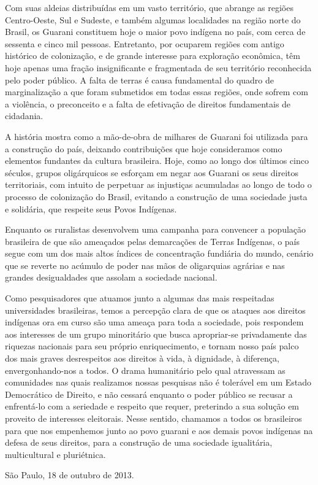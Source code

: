 Com suas aldeias distribuídas em um vasto território, que abrange as
regiões Centro-Oeste, Sul e Sudeste, e também algumas localidades na
região norte do Brasil, os Guarani constituem hoje o maior povo
indígena no país, com cerca de sessenta e cinco mil pessoas.
Entretanto, por ocuparem regiões com antigo histórico de colonização, e
de grande interesse para exploração econômica, têm hoje apenas uma
fração insignificante e fragmentada de seu território reconhecida pelo
poder público. A falta de terras é causa fundamental do quadro de
marginalização a que foram submetidos em todas essas regiões, onde
sofrem com a violência, o preconceito e a falta de efetivação de
direitos fundamentais de cidadania. 

A história mostra como a mão-de-obra de milhares de Guarani foi
utilizada para a construção do país, deixando contribuições que hoje
consideramos como elementos fundantes da cultura brasileira. Hoje, como
ao longo dos últimos cinco séculos, grupos oligárquicos se esforçam em
negar aos Guarani os seus direitos territoriais, com intuito de
perpetuar as injustiças acumuladas ao longo de todo o processo de
colonização do Brasil, evitando a construção de uma sociedade justa e
solidária, que respeite seus Povos Indígenas.

Enquanto os ruralistas desenvolvem uma campanha para convencer a
população brasileira de que são ameaçados pelas demarcações de Terras
Indígenas, o país segue com um dos mais altos índices de concentração
fundiária do mundo, cenário que se reverte no acúmulo de poder nas mãos
de oligarquias agrárias e nas grandes desigualdades que assolam a
sociedade nacional. 

Como pesquisadores que atuamos junto a algumas das mais respeitadas
universidades brasileiras, temos a percepção clara de que os ataques
aos direitos indígenas ora em curso são uma ameaça para toda a
sociedade, pois respondem aos interesses de um grupo minoritário que
busca apropriar-se privadamente das riquezas nacionais para seu próprio
enriquecimento, e tornam nosso país palco dos mais graves desrespeitos
aos direitos à vida, à dignidade, à diferença, envergonhando-nos a
todos. O drama humanitário pelo qual atravessam as comunidades nas
quais realizamos nossas pesquisas não é tolerável em um Estado
Democrático de Direito, e não cessará enquanto o poder público se
recusar a enfrentá-lo com a seriedade e respeito que requer, preterindo
a sua solução em proveito de interesses eleitorais. Nesse sentido,
chamamos a todos os brasileiros para que nos empenhemos junto ao povo
guarani e aos demais povos indígenas na defesa de seus direitos, para a
construção de uma sociedade igualitária, multicultural e pluriétnica.

São Paulo, 18 de outubro de 2013.

